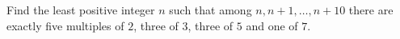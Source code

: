 Find the least positive integer $n$ such that among $n,n+1,\dots,n+10$ there are exactly five multiples of $2$, three of $3$, three of $5$ and one of $7$.

